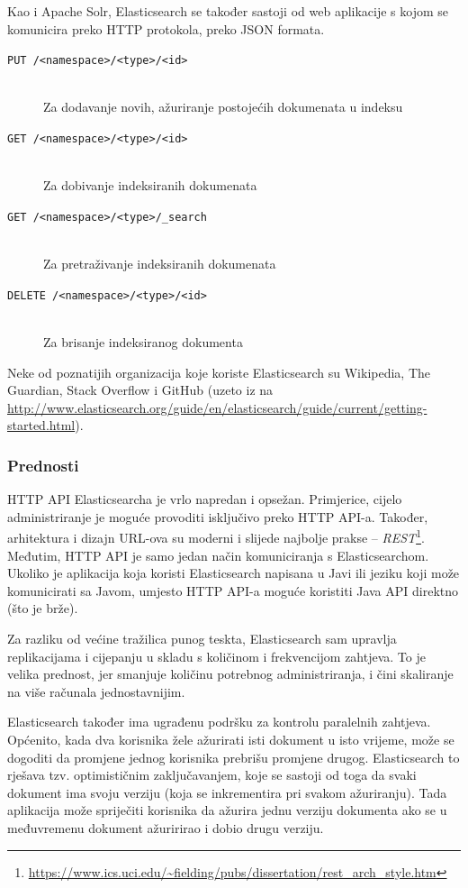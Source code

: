 \documentclass[a4paper,twoside,12pt]{scrreprt}
\begin{document}
Kao i Apache Solr, Elasticsearch se također sastoji od web aplikacije s kojom se komunicira preko HTTP protokola, preko JSON formata.

\begin{description}
  \item[\texttt{PUT /<namespace>/<type>/<id>}] \hfill \\ Za dodavanje novih, ažuriranje postojećih dokumenata u indeksu
  \item[\texttt{GET /<namespace>/<type>/<id>}] \hfill \\ Za dobivanje indeksiranih dokumenata
  \item[\texttt{GET /<namespace>/<type>/\_search}] \hfill \\ Za pretraživanje indeksiranih dokumenata
  \item[\texttt{DELETE /<namespace>/<type>/<id>}] \hfill \\ Za brisanje indeksiranog dokumenta
\end{description}

Neke od poznatijih organizacija koje koriste Elasticsearch su Wikipedia, The Guardian, Stack Overflow i GitHub (uzeto iz \cite{elasticguide} na \url{http://www.elasticsearch.org/guide/en/elasticsearch/guide/current/getting-started.html}).

\subsubsection{Prednosti}

HTTP API Elasticsearcha je vrlo napredan i opsežan. Primjerice, cijelo administriranje je moguće provoditi isključivo preko HTTP API-a. Također, arhitektura i dizajn URL-ova su moderni i slijede najbolje prakse – \textit{REST}\footnote{\url{https://www.ics.uci.edu/~fielding/pubs/dissertation/rest_arch_style.htm}}. Međutim, HTTP API je samo jedan način komuniciranja s Elasticsearchom. Ukoliko je aplikacija koja koristi Elasticsearch napisana u Javi ili jeziku koji može komunicirati sa Javom, umjesto HTTP API-a moguće koristiti Java API direktno (što je brže).

Za razliku od većine tražilica punog teskta, Elasticsearch sam upravlja replikacijama i cijepanju u skladu s količinom i frekvencijom zahtjeva. To je velika prednost, jer smanjuje količinu potrebnog administriranja, i čini skaliranje na više računala jednostavnijim.

Elasticsearch također ima ugrađenu podršku za kontrolu paralelnih zahtjeva. Općenito, kada dva korisnika žele ažurirati isti dokument u isto vrijeme, može se dogoditi da promjene jednog korisnika prebrišu promjene drugog. Elasticsearch to rješava tzv. optimističnim zaključavanjem, koje se sastoji od toga da svaki dokument ima svoju verziju (koja se inkrementira pri svakom ažuriranju). Tada aplikacija može spriječiti korisnika da ažurira jednu verziju dokumenta ako se u međuvremenu dokument ažuririrao i dobio drugu verziju.
\end{document}
